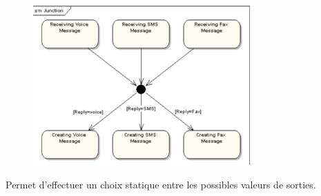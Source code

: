 \documentclass[../Syllabus.tex]{subfiles}
\begin{document}
\begin{figure}
    \includegraphics[scale=0.35]{img/junction.png}
\end{figure}

Permet d'effectuer un choix statique entre les possibles valeurs de sorties.
\end{document}
